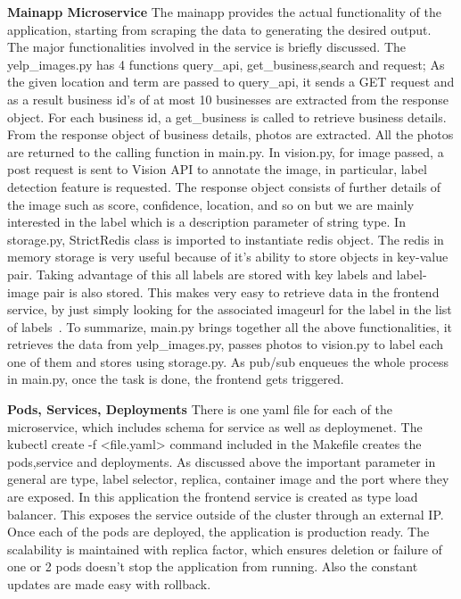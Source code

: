 \item \textbf{Mainapp Microservice} The mainapp provides the actual
  functionality of the application, starting from scraping the data to
  generating the desired output. The major functionalities involved in
  the service is briefly discussed.  The yelp_images.py has 4
  functions query_api, get_business,search and request; As
  the given location and term are passed to query_api, it sends a
  GET request and as a result business id’s of at most 10 businesses
  are extracted from the response object. For each business id, a
  get_business is called to retrieve business details. From the
  response object of business details, photos are extracted. All the
  photos are returned to the calling function in main.py.  In
  vision.py, for image passed, a post request is sent to Vision API to
  annotate the image, in particular, label detection feature is
  requested. The response object consists of further details of the
  image such as score, confidence, location, and so on but we are
  mainly interested in the label which is a description parameter of
  string type. In storage.py, StrictRedis class is imported to
  instantiate redis object. The redis in memory storage is very useful
  because of it’s ability to store objects in key-value pair. Taking
  advantage of this all labels are stored with key labels and
  label-image pair is also stored. This makes very easy to retrieve
  data in the frontend service, by just simply looking for the
  associated imageurl for the label in the list of
  labels~\cite{hid-sp18-602-redis-implementation}.  To summarize,
  main.py brings together all the above functionalities, it retrieves
  the data from yelp_images.py, passes photos to vision.py to label
  each one of them and stores using storage.py. As pub/sub enqueues
  the whole process in main.py, once the task is done, the frontend
  gets triggered.
  
\item \textbf{Pods, Services, Deployments} There is one yaml file for
  each of the microservice, which includes schema for service as well
  as deploymenet. The kubectl create -f <file.yaml> command included
  in the Makefile creates the pods,service and deployments. As
  discussed above the important parameter in general are type, label
  selector, replica, container image and the port where they are
  exposed.  In this application the frontend service is created as
  type load balancer. This exposes the service outside of the cluster
  through an external IP. Once each of the pods are deployed, the
  application is production ready. The scalability is maintained with
  replica factor, which ensures deletion or failure of one or 2 pods
  doesn’t stop the application from running. Also the constant updates
  are made easy with rollback.
  
